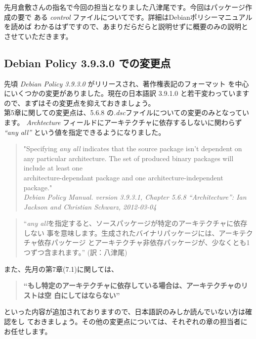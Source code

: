\documentclass[mingoth,a4paper]{jsarticle}
\begin{document}
先月倉敷さんの指名で今回の担当となりました八津尾です。今回はパッケージ作成の要で
ある {\it control} ファイルについてです。詳細はDebianポリシーマニュアルを読めば
わかるはずですので、あまりだらだらと説明せずに概要のみの説明とさせていただきます。

\subsection{Debian Policy 3.9.3.0 での変更点}
先頃 {\it Debian Policy 3.9.3.0} がリリースされ、著作権表記のフォーマット
を中心にいくつかの変更がありました。現在の日本語訳 3.9.1.0 と若干変わっています
ので、まずはその変更点を抑えておきましょう。\\
第5章に関しての変更点は、5.6.8 の{\it *.dsc}ファイルについての変更のみとなってい
ます。 {\it Archtecture} フィールドにアーキテクチャに依存するしないに関わらず
{\it ``any all''} という値を指定できるようになりました。
\begin{quote}
"Specifying {\it any all} indicates that the source package isn't dependent on any
particular architecture. The set of produced binary packages will include at
least one \\architecture-dependant package and one architecture-independent
package."\\
{\it Debian Policy Manual. version 3.9.3.1, Chapter 5.6.8 ``Architecture'':
Ian Jackson and Christian Schwarz, 2012-03-04}
\end{quote}
\begin{quote}
``{\it any all}を指定すると、ソースパッケージが特定のアーキテクチャに依存しない
事を意味します。生成されたバイナリパッケージには、アーキテクチャ依存パッケージ
とアーキテクチャ非依存パッケージが、少なくとも1つずつ含まれます。'' (訳：八津尾)
\end{quote}
また、先月の第7章(7.1)に関しては、
\begin{quote}
{\bf ``もし特定のアーキテクチャに依存している場合は、アーキテクチャのリストは空
白にしてはならない''}
\end{quote}
といった内容が追加されておりますので、日本語訳のみしか読んでいない方は確認をし
ておきましょう。その他の変更点については、それぞれの章の担当者にお任せします。
\end{document}

